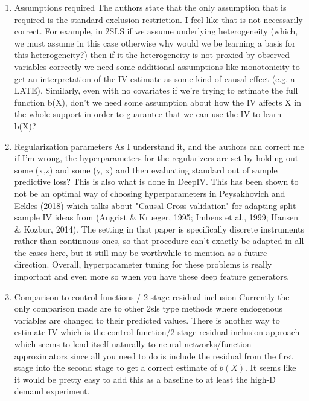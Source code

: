 \documentclass{article}
\begin{document}
\begin{enumerate}
    \item Assumptions required The authors state that the only assumption that is required is the standard exclusion restriction. I feel like that is not necessarily correct. For example, in 2SLS if we assume underlying heterogeneity (which, we must assume in this case otherwise why would we be learning a basis for this heterogeneity?) then if it the heterogeneity is not proxied by observed variables correctly we need some additional assumptions like monotonicity to get an interpretation of the IV estimate as some kind of causal effect (e.g. a LATE). Similarly, even with no covariates if we're trying to estimate the full function b(X), don't we need some assumption about how the IV affects X in the whole support in order to guarantee that we can use the IV to learn b(X)?
    

\item Regularization parameters As I understand it, and the authors can correct me if I'm wrong, the hyperparameters for the regularizers are set by holding out some (x,z) and some (y, x) and then evaluating standard out of sample predictive loss? This is also what is done in DeepIV. This has been shown to not be an optimal way of choosing hyperparameters in Peysakhovich and Eckles (2018) which talks about "Causal Cross-validation" for adapting split-sample IV ideas from (Angrist \& Krueger, 1995; Imbens et al., 1999; Hansen \& Kozbur, 2014). The setting in that paper is specifically discrete instruments rather than continuous ones, so that procedure can't exactly be adapted in all the cases here, but it still may be worthwhile to mention as a future direction. Overall, hyperparameter tuning for these problems is really important and even more so when you have these deep feature generators.


\item Comparison to control functions / 2 stage residual inclusion Currently the only comparison made are to other 2sls type methods where endogenous variables are changed to their predicted values. There is another way to estimate IV which is the control function/2 stage residual inclusion approach which seems to lend itself naturally to neural networks/function approximators since all you need to do is include the residual from the first stage into the second stage to get a correct estimate of $b(X)$. It seems like it would be pretty easy to add this as a baseline to at least the high-D demand experiment.


\end{enumerate}
\end{document}
